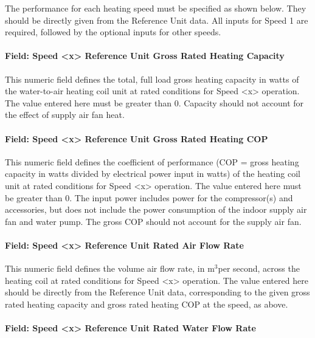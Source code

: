 The performance for each heating speed must be specified as shown below. They should be directly given from the Reference Unit data. All inputs for Speed 1 are required, followed by the optional inputs for other speeds.

\paragraph{Field: Speed \textless{}x\textgreater{} Reference Unit Gross Rated Heating Capacity}\label{field-speed-x-reference-unit-gross-rated-heating-capacity-1}

This numeric field defines the total, full load gross heating capacity in watts of the water-to-air heating coil unit at rated conditions for Speed \textless{}x\textgreater{} operation. The value entered here must be greater than 0. Capacity should not account for the effect of supply air fan heat.

\paragraph{Field: Speed \textless{}x\textgreater{} Reference Unit Gross Rated Heating COP}\label{field-speed-x-reference-unit-gross-rated-heating-cop-1}

This numeric field defines the coefficient of performance (COP = gross heating capacity in watts divided by electrical power input in watts) of the heating coil unit at rated conditions for Speed \textless{}x\textgreater{} operation. The value entered here must be greater than 0. The input power includes power for the compressor(s) and accessories, but does not include the power consumption of the indoor supply air fan and water pump. The gross COP should not account for the supply air fan.

\paragraph{Field: Speed \textless{}x\textgreater{} Reference Unit Rated Air Flow Rate}\label{field-speed-x-reference-unit-rated-air-flow-rate-3}

This numeric field defines the volume air flow rate, in m\(^{3}\)per second, across the heating coil at rated conditions for Speed \textless{}x\textgreater{} operation. The value entered here should be directly from the Reference Unit data, corresponding to the given gross rated heating capacity and gross rated heating COP at the speed, as above.

\paragraph{Field: Speed \textless{}x\textgreater{} Reference Unit Rated Water Flow Rate}\label{field-speed-x-reference-unit-rated-water-flow-rate-1}

